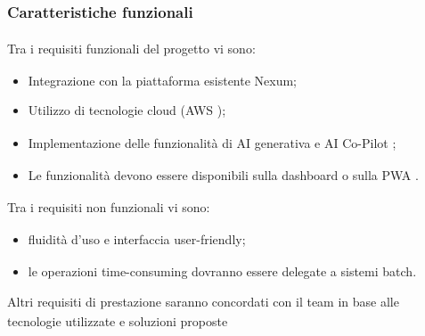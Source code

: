 \documentclass[a4paper,11pt]{article}
\begin{document}
\subsubsection{Caratteristiche funzionali\textsubscript{}
}
Tra i requisiti\textsubscript{}
 funzionali\textsubscript{}
 del progetto\textsubscript{}
 vi sono:
\begin{itemize}[noitemsep, topsep=0pt]
 \item Integrazione con la piattaforma esistente Nexum;
 \item Utilizzo di tecnologie cloud (AWS\textsubscript{}
);
 \item Implementazione\textsubscript{}
 delle funzionalità\textsubscript{}
 di AI\textsubscript{}
 generativa\textsubscript{}
 e AI\textsubscript{}
 Co-Pilot\textsubscript{}
;
 \item Le funzionalità\textsubscript{}
 devono essere disponibili sulla dashboard\textsubscript{}
 o sulla PWA\textsubscript{}
.
\end{itemize}
\vspace{0.5em}
Tra i requisiti\textsubscript{}
 non funzionali\textsubscript{}
 vi sono:
\begin{itemize}[noitemsep, topsep=0pt]
 \item fluidità d'uso e interfaccia\textsubscript{} user-friendly;
 \item le operazioni time-consuming dovranno essere delegate a sistemi batch.
\end{itemize}
Altri requisiti\textsubscript{}
 di prestazione saranno concordati con il team in base alle tecnologie utilizzate e soluzioni proposte
\end{document}

